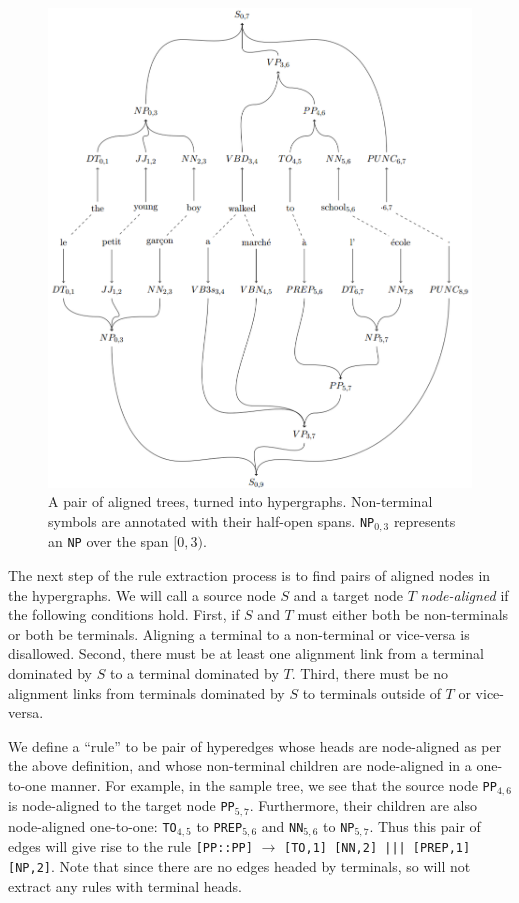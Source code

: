 \documentclass[nofonts]{pbml} %
\begin{document}
\begin{figure}[ht!]
\centering
\includegraphics[scale=0.25]{simplehg.png}
\caption{A pair of aligned trees, turned into hypergraphs. Non-terminal symbols are annotated with their half-open spans. \texttt{NP}$_{0,3}$ represents an \texttt{NP} over the span $[0,3)$.}
\label{simplehgfig}
\end{figure}

The next step of the rule extraction process is to find pairs of aligned nodes in the hypergraphs.
We will call a source node $S$ and a target node $T$ \emph{node-aligned} if the following conditions hold.
First, if $S$ and $T$ must either both be non-terminals or both be terminals.
Aligning a terminal to a non-terminal or vice-versa is disallowed.
Second, there must be at least one alignment link from a terminal dominated by $S$ to a terminal dominated by $T$.
Third, there must be no alignment links from terminals dominated by $S$ to terminals outside of $T$ or vice-versa.

We define a ``rule'' to be pair of hyperedges whose heads are node-aligned as per the above definition,
and whose non-terminal children are node-aligned in a one-to-one manner.
For example, in the sample tree, we see that the source node \texttt{PP}$_{4,6}$ is
node-aligned to the target node \texttt{PP}$_{5,7}$. Furthermore, their children are also node-aligned
one-to-one: \texttt{TO}$_{4,5}$ to \texttt{PREP}$_{5,6}$ and \texttt{NN}$_{5,6}$ to \texttt{NP}$_{5,7}$.
Thus this pair of edges will give rise to the rule \texttt{[PP::PP]} $\rightarrow$ \texttt{[TO,1] [NN,2] ||| [PREP,1] [NP,2]}.
Note that since there are no edges headed by terminals, so will not extract any rules with terminal heads.
\end{document}
